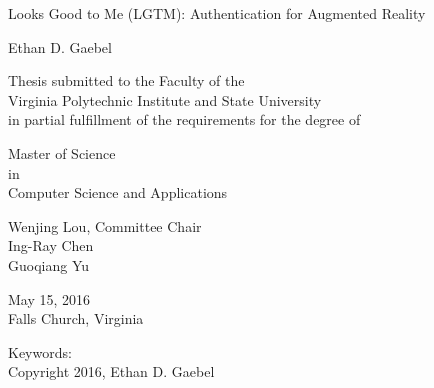 \documentclass[12pt]{report}
\begin{document}
\thispagestyle{empty}
\begin{center}

{\Large 
Looks Good to Me (LGTM): 
Authentication for Augmented Reality
}

\vfill

Ethan D. Gaebel

\vfill

Thesis submitted to the Faculty of the \\
Virginia Polytechnic Institute and State University \\
in partial fulfillment of the requirements for the degree of

\vfill

Master of Science \\
in \\
Computer Science and Applications

\vfill

Wenjing Lou, Committee Chair \\
Ing-Ray Chen \\
Guoqiang Yu 

\vfill

May 15, 2016 \\
Falls Church, Virginia

\vfill

Keywords: 
\\
Copyright 2016, Ethan D. Gaebel

\end{center}

\pagebreak
\end{document}
